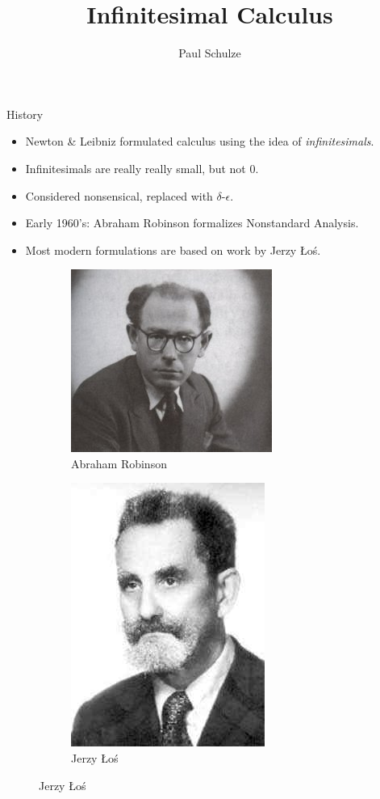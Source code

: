\documentclass{beamer}
\title{Infinitesimal Calculus}
\author{Paul Schulze}
\date{}
\theoremstyle{plain}
\theoremstyle{definition}
\begin{document}
	
\begin{frame}
	\titlepage
\end{frame}
	
	
\begin{frame}{History}
	\begin{itemize}
		\item Newton \& Leibniz formulated calculus using the idea of \textit{infinitesimals}.
		\item Infinitesimals are really really small, but not $0$.
		\item Considered nonsensical, replaced with $\delta$-$\epsilon$.
		\item Early 1960's: Abraham Robinson formalizes Nonstandard Analysis.
		\item Most modern formulations are based on work by Jerzy \L o\'s.
	\end{itemize}
	\begin{figure}[h]
		\begin{subfigure}{0.4\textwidth}
			\centering
			\includegraphics[width=0.6\linewidth]{Robinson}
			\caption{Abraham Robinson}
		\end{subfigure}
		\begin{subfigure}{0.4\textwidth}
			\centering
			\includegraphics[width=0.4\linewidth]{Los}
			\caption{Jerzy \L o\'s}
		\end{subfigure}
	\end{figure}
\end{frame}
\end{document}
